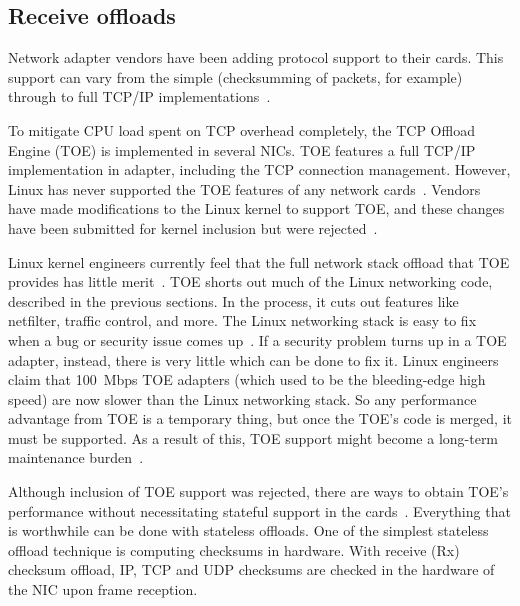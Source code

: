 
\subsection{Receive offloads}\label{subsec:linux-ingress-offloads}
Network adapter vendors have been adding protocol support to their cards.
This support can vary from the simple (checksumming of packets, for example)
through to full TCP/IP implementations~\cite{linux-and-tcp-offload-engines}.

To mitigate CPU load spent on TCP overhead completely, the TCP Offload Engine (TOE) is implemented in several NICs.
TOE features a full TCP/IP implementation in adapter, including the TCP connection management.
However, Linux has never supported the TOE features of any network cards~\cite{linux-and-tcp-offload-engines}.
Vendors have made modifications to the Linux kernel to support TOE,
and these changes have been submitted for kernel inclusion but were rejected~\cite{linux-foundation-toe}. 

Linux kernel engineers currently feel that the full network stack offload
that TOE provides has little merit~\cite{linux-foundation-toe}.
TOE shorts out much of the Linux networking code, described in the previous sections.
In the process, it cuts out features like netfilter, traffic control, and more.
The Linux networking stack is easy to fix when a bug or security issue comes up~\cite{linux-and-tcp-offload-engines}.
If a security problem turns up in a TOE adapter, instead, there is very little which can be done to fix it.
Linux engineers claim that 100~Mbps TOE adapters
(which used to be the bleeding-edge high speed)
are now slower than the Linux networking stack.
So any performance advantage from TOE is a temporary thing, but once the TOE's code is merged, it must be supported.
As a result of this, TOE support might become a long-term maintenance burden~\cite{linux-and-tcp-offload-engines}.

Although inclusion of TOE support was rejected, there are ways to obtain TOE's performance without
necessitating stateful support in the cards~\cite{linux-and-tcp-offload-engines}.
Everything that is worthwhile can be done with stateless offloads.
One of the simplest stateless offload technique is computing checksums in hardware.
With receive (Rx) checksum offload, IP, TCP and UDP checksums are checked in the hardware of the NIC upon frame reception.

